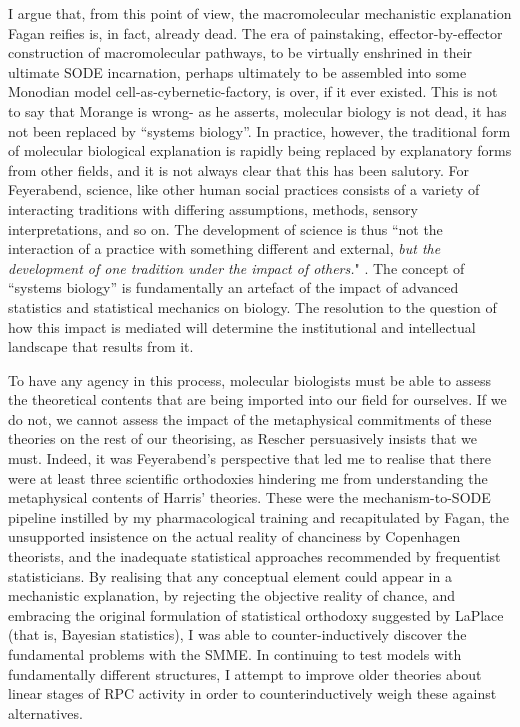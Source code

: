 I argue that, from this point of view, the macromolecular mechanistic explanation Fagan reifies is, in fact, already dead. The era of painstaking, effector-by-effector construction of macromolecular pathways, to be virtually enshrined in their ultimate SODE incarnation, perhaps ultimately to be assembled into some Monodian model cell-as-cybernetic-factory, is over, if it ever existed. This is not to say that Morange is wrong- as he asserts, molecular biology is not dead, it has not been replaced by ``systems biology''. In practice, however, the traditional form of molecular biological explanation is rapidly being replaced by explanatory forms from other fields, and it is not always clear that this has been salutory. For Feyerabend, science, like other human social practices consists of a variety of interacting traditions with differing assumptions, methods, sensory interpretations, and so on. The development of science is thus ``not the interaction of a practice with something different and external, \textit{but the development of one tradition under the impact of others.}" \cite[p.232]{Feyerabend1993}. The concept of ``systems biology'' is fundamentally an artefact of the impact of advanced statistics and statistical mechanics on biology. The resolution to the question of how this impact is mediated will determine the institutional and intellectual landscape that results from it. 

To have any agency in this process, molecular biologists must be able to assess the theoretical contents that are being imported into our field for ourselves. If we do not, we cannot assess the impact of the metaphysical commitments of these theories on the rest of our theorising, as Rescher persuasively insists that we must. Indeed, it was Feyerabend's perspective that led me to realise that there were at least three scientific orthodoxies hindering me from understanding the metaphysical contents of Harris' theories. These were the mechanism-to-SODE pipeline instilled by my pharmacological training and recapitulated by Fagan, the unsupported insistence on the actual reality of chanciness by Copenhagen theorists, and the inadequate statistical approaches recommended by frequentist statisticians. By realising that any conceptual element could appear in a mechanistic explanation, by rejecting the objective reality of chance, and embracing the original formulation of statistical orthodoxy suggested by LaPlace (that is, Bayesian statistics), I was able to counter-inductively discover the fundamental problems with the SMME. In continuing to test models with fundamentally different structures, I attempt to improve older theories about linear stages of RPC activity in order to counterinductively weigh these against alternatives.


